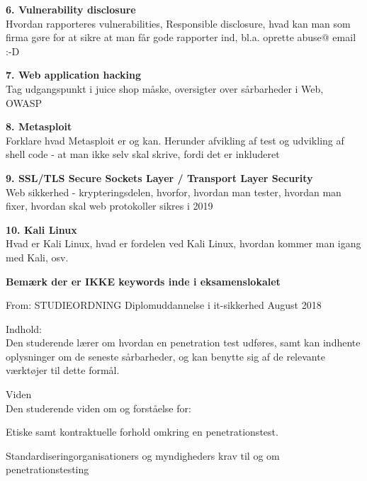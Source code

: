 \documentclass[Screen16to9,17pt]{foils}
\begin{document}
\begin{list2}
\item {\bf 6. Vulnerability disclosure}\\
Hvordan rapporteres vulnerabilities, Responsible disclosure, hvad kan man som firma gøre
for at sikre at man får gode rapporter ind, bl.a. oprette abuse@ email :-D

\item {\bf 7. Web application hacking}\\
Tag udgangspunkt i juice shop måske, oversigter over sårbarheder i Web, OWASP

\item {\bf 8. Metasploit}\\
Forklare hvad Metasploit er og kan. Herunder afvikling af test og udvikling af shell code
- at man ikke selv skal skrive, fordi det er inkluderet

\item {\bf 9. SSL/TLS Secure Sockets Layer / Transport Layer Security}\\
Web sikkerhed - krypteringsdelen,
hvorfor, hvordan man tester, hvordan man fixer, hvordan skal web protokoller sikres i 2019

\item {\bf 10. Kali Linux}\\
Hvad er Kali Linux, hvad er fordelen ved Kali Linux, hvordan kommer man igang med Kali, osv.
\end{list2}

\centerline{\bf Bemærk der er IKKE keywords inde i eksamenslokalet}





From: STUDIEORDNING Diplomuddannelse i it-sikkerhed August 2018

Indhold:\\
Den studerende lærer om hvordan en penetration test udføres, samt kan indhente oplysninger om de seneste sårbarheder, og kan benytte sig af de relevante værktøjer til dette formål.

Viden\\
Den studerende viden om og forståelse for:
\begin{list2}
\item Etiske samt kontraktuelle forhold omkring en penetrationstest.
\item Standardiseringorganisationers og myndigheders krav til og om penetrationstesting
\end{list2}
\end{document}
